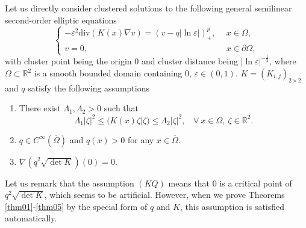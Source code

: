 \documentclass[12pt,reqno]{amsart}
\numberwithin{equation}{section}
\theoremstyle{definition}
\theoremstyle{remark}
\begin{document}
Let us directly consider   clustered solutions to the following general semilinear second-order elliptic equations 
\begin{equation}\label{key equa}
\begin{cases}
-\varepsilon^2\text{div}\left (K(x)\nabla v\right )= \left (v-q|\ln\varepsilon|\right )^{p}_+,\ \ &x\in \Omega,\\
v=0,\ \ &x\in\partial \Omega,
\end{cases}
\end{equation}
with cluster point being the origin $ 0 $ and cluster distance being $ |\ln\varepsilon|^{-\frac{1}{2}} $, where $ \Omega\subset \mathbb{R}^2 $ is a smooth bounded domain containing $ 0 $, $ \varepsilon\in(0,1) $. $ K=(K_{i,j})_{2\times2} $  and $ q $ satisfy the following assumptions
\begin{enumerate}
	\item[(K1).] %
	There exist  $ \Lambda_1,\Lambda_2>0 $ such that $$ \Lambda_1|\zeta|^2\le (K(x)\zeta|\zeta) \le \Lambda_2|\zeta|^2,\ \ \ \ \forall\ x\in \Omega, \ \zeta\in \mathbb{R}^2.$$
	\item[(Q1).]  $ q \in C^{\infty}(\overline{\Omega}) $ and $ q(x)>0 $ for any $ x\in\overline{\Omega}. $
	\item[(KQ).]   $ \nabla \left (q^2\sqrt{\det K}\right )(0)=0 $.
\end{enumerate}

Let us remark that the assumption $ (KQ) $ means that $ 0 $ is a critical point of $ q^2\sqrt{\det K} $, which seems to be artificial. However, when we prove Theorems \ref{thm01}-\ref{thm05} by the special form of $q$ and $K$, this assumption is satisfied automatically.
\end{document}

